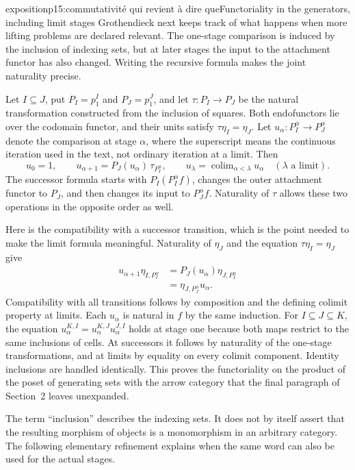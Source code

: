 \begin{dcomment}{exposition}{p15:commutativité qui revient à dire que}{Functoriality in the generators, including limit stages}
Grothendieck next keeps track of what happens when more lifting problems are declared relevant. The one-stage comparison is induced by the inclusion of indexing sets, but at later stages the input to the attachment functor has also changed. Writing the recursive formula makes the joint naturality precise.

Let $I\subseteq J$, put $P_I=p_1^I$ and $P_J=p_1^J$, and let $\tau:P_I\to P_J$ be the natural transformation constructed from the inclusion of squares. Both endofunctors lie over the codomain functor, and their units satisfy $\tau\eta_I=\eta_J$. Let $u_\alpha:P_I^\alpha\to P_J^\alpha$ denote the comparison at stage $\alpha$, where the superscript means the continuous iteration used in the text, not ordinary iteration at a limit. Then
\[
 u_0=1,\qquad
 u_{\alpha+1}=P_J(u_\alpha)\,\tau_{P_I^\alpha},\qquad
 u_\lambda=\mathop{\mathrm{colim}}_{\alpha<\lambda}u_\alpha
 \quad(\lambda\text{ a limit}).
\]
The successor formula starts with $P_I(P_I^\alpha f)$, changes the outer attachment functor to $P_J$, and then changes its input to $P_J^\alpha f$. Naturality of $\tau$ allows these two operations in the opposite order as well.

Here is the compatibility with a successor transition, which is the point needed to make the limit formula meaningful. Naturality of $\eta_J$ and the equation $\tau\eta_I=\eta_J$ give
\[
 \begin{split}
 u_{\alpha+1}\eta_{I,P_I^\alpha}
 &=P_J(u_\alpha)\eta_{J,P_I^\alpha}\\
 &=\eta_{J,P_J^\alpha}u_\alpha.
 \end{split}
\]
Compatibility with all transitions follows by composition and the defining colimit property at limits. Each $u_\alpha$ is natural in $f$ by the same induction. For $I\subseteq J\subseteq K$, the equation $u_\alpha^{K,I}=u_\alpha^{K,J}u_\alpha^{J,I}$ holds at stage one because both maps restrict to the same inclusions of cells. At successors it follows by naturality of the one-stage transformations, and at limits by equality on every colimit component. Identity inclusions are handled identically. This proves the functoriality on the product of the poset of generating sets with the arrow category that the final paragraph of Section~2 leaves unexpanded.

The term ``inclusion'' describes the indexing sets. It does not by itself assert that the resulting morphism of objects is a monomorphism in an arbitrary category. The following elementary refinement explains when the same word can also be used for the actual stages.
\end{dcomment}

